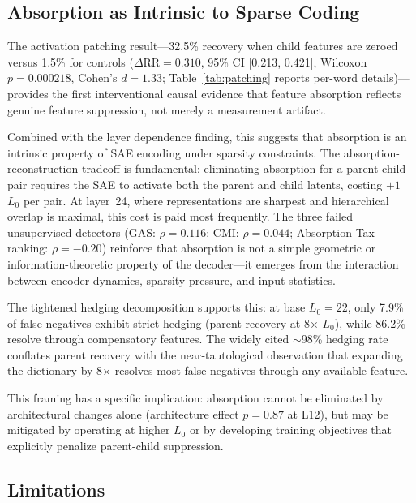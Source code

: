 \documentclass{article}
\begin{document}
\subsection{Absorption as Intrinsic to Sparse Coding}
\label{sec:intrinsic}

The activation patching result---32.5\% recovery when child features are zeroed versus 1.5\% for controls ($\Delta\text{RR} = 0.310$, 95\% CI [0.213, 0.421], Wilcoxon $p = 0.000218$, Cohen's $d = 1.33$; Table~\ref{tab:patching} reports per-word details)---provides the first interventional causal evidence that feature absorption reflects genuine feature suppression, not merely a measurement artifact.

Combined with the layer dependence finding, this suggests that absorption is an intrinsic property of SAE encoding under sparsity constraints. The absorption-reconstruction tradeoff is fundamental: eliminating absorption for a parent-child pair requires the SAE to activate both the parent and child latents, costing $+1$ $L_0$ per pair. At layer~24, where representations are sharpest and hierarchical overlap is maximal, this cost is paid most frequently. The three failed unsupervised detectors (GAS: $\rho = 0.116$; CMI: $\rho = 0.044$; Absorption Tax ranking: $\rho = -0.20$) reinforce that absorption is not a simple geometric or information-theoretic property of the decoder---it emerges from the interaction between encoder dynamics, sparsity pressure, and input statistics.

The tightened hedging decomposition supports this: at base $L_0 = 22$, only 7.9\% of false negatives exhibit strict hedging (parent recovery at 8$\times$ $L_0$), while 86.2\% resolve through compensatory features. The widely cited ${\sim}$98\% hedging rate conflates parent recovery with the near-tautological observation that expanding the dictionary by 8$\times$ resolves most false negatives through any available feature.

This framing has a specific implication: absorption cannot be eliminated by architectural changes alone (architecture effect $p = 0.87$ at L12), but may be mitigated by operating at higher $L_0$ or by developing training objectives that explicitly penalize parent-child suppression.

\subsection{Limitations}
\label{sec:limitations}
\end{document}
